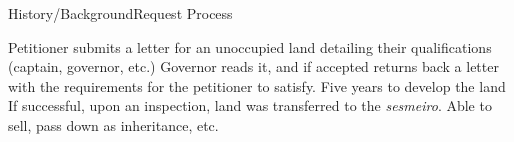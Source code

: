 \documentclass[aspectratio=1610]{beamer}
\begin{document}
\begin{frame}{History/Background}{Request Process}
    \begin{outline}
        \1 Petitioner submits a letter for an unoccupied land detailing their qualifications (captain, governor, etc.)
        \vspace{1mm}
        \1 Governor reads it, and if accepted returns back a letter with the requirements for the petitioner to satisfy.
        \vspace{1mm}
        \1 Five years to develop the land
        \vspace{1mm}
        \1 If successful, upon an inspection, land was transferred to the \textit{sesmeiro}.
        \vspace{1mm}
        \1 Able to sell, pass down as inheritance, etc. 
    \end{outline}
\end{frame}

    
\end{document}
